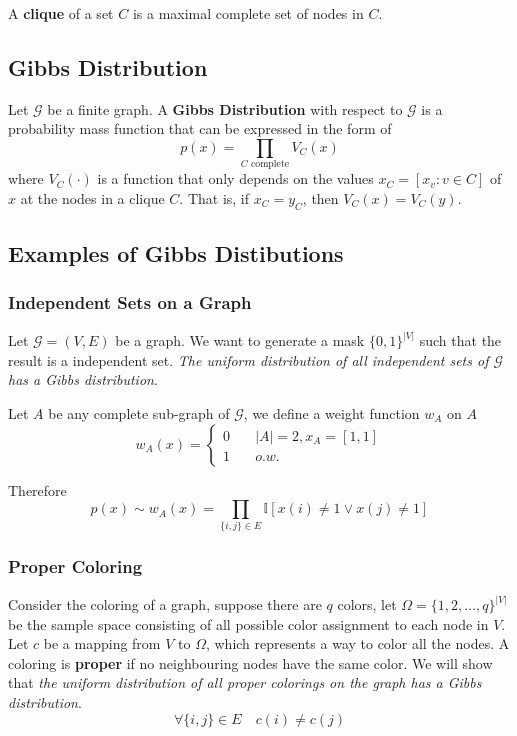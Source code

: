         \begin{definition}[Clique]\label{def:Clique}
            A \textbf{clique} of a set $C$ is a maximal complete set of nodes in $C$.
        \end{definition}

    \subsection{Gibbs Distribution}
        \begin{definition}\label{def:GibbsDistribution}
            Let $\mathcal{G}$ be a finite graph. A \textbf{Gibbs Distribution} with respect to $\mathcal{G}$ is a probability mass function that can be expressed in the form of
            \[ p(x) = \prod_{\text{$C$ complete}}V_C(x) \]
            where $V_C(\cdot)$ is a function that only depends on the values $x_C = [x_v:v \in C]$ of $x$ at the nodes in a clique $C$. That is, if $x_C = y_C$, then $V_C(x) = V_C(y)$.
        \end{definition}

    \subsection{Examples of Gibbs Distibutions}
        \subsubsection{Independent Sets on a Graph}
        Let $\mathcal{G}=(V,E)$ be a graph. We want to generate a mask $\{0,1\}^{|V|}$ such that the result is a independent set. \emph{The uniform distribution of all independent sets of $\mathcal{G}$ has a Gibbs distribution}.

        Let $A$ be any complete sub-graph of $\mathcal{G}$, we define a weight function $w_A$ on $A$
        \[ w_A(x) = \begin{cases}
            0 &\quad |A| = 2, x_A = [1,1]\\
            1 &\quad o.w.
        \end{cases} \] 

        Therefore
        \[ p(x) \sim w_A(x) = \prod_{\{i,j\}\in E}\mathbb{I}[x(i) \neq 1 \vee x(j) \neq 1] \]

        \subsubsection{Proper Coloring}
        Consider the coloring of a graph, suppose there are $q$ colors, let $\Omega=\{1,2,\dots,q\}^{|V|}$ be the sample space consisting of all possible color assignment to each node in $V$. Let $c$ be a mapping from $V$ to $\Omega$, which represents a way to color all the nodes. A coloring is \textbf{proper} if no neighbouring nodes have the same color. We will show that \emph{the uniform distribution of all proper colorings on the graph has a Gibbs distribution}.
        \[ \forall \{i,j\} \in E \quad c(i) \neq c(j) \]

